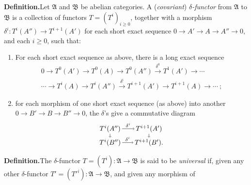 {\par\smallskip\noindent\textbf{Definition.}\enspace Let $\mathfrak A$ and $\mathfrak B$ be abelian categories. A (\emph{covariant}) \emph{$\delta$-functor} from $\mathfrak A$ to $\mathfrak B$ is a collection of functors $T=(T^i)_{i\geqslant0}$, together with a morphism $\delta^i\colon T^i(A'')\to T^{i+1}(A')$ for each short exact sequence $0\to A'\to A\to A''\to0$, and each $i\geqslant0$, such that:
\begin{enumerate}[label=(\arabic*),leftmargin=2.2em,itemsep=0pt,topsep=1pt,parsep=0pt]
\item For each short exact sequence as above, there is a long exact sequence
\[
\begin{gathered}
  0\to T^0(A')\to T^0(A)\to T^0(A'')
    \xrightarrow{\delta^0}T^1(A')\to\cdots\\
  \cdots\to T^i(A)\to T^i(A'')\xrightarrow{\delta^i}T^{i+1}(A')
    \to T^{i+1}(A)\to\cdots\ ; 
\end{gathered}
\]
\item for each morphism of one short exact sequence (as above) into another $0\to B'\to B\to B''\to0$, the $\delta$'s give a commutative diagram
\[
\begin{tikzpicture}[baseline=(current bounding box.center),inner sep=2pt]
  \node (a) at (0,.72) {$T^i(A'')$};
  \node (b) at (2.02,.72) {$T^{i+1}(A')$};
  \node (c) at (0,0) {$T^i(B'')$};
  \node (d) at (2.02,0) {$T^{i+1}(B')$.};
  \draw[->] (a) -- node[above] {$\scriptstyle\delta^i$} (b);
  \draw[->] (a) -- (c);
  \draw[->] (b) -- (d);
  \draw[->] (c) -- node[above] {$\scriptstyle\delta^i$} (d);
\end{tikzpicture}
\]
\end{enumerate}

\par\smallskip\noindent\textbf{Definition.}\enspace The $\delta$-functor $T=(T^i)\colon\mathfrak A\to\mathfrak B$ is said to be \emph{universal} if, given any other $\delta$-functor $T'=(T'^i)\colon\mathfrak A\to\mathfrak B$, and given any morphism of
}
